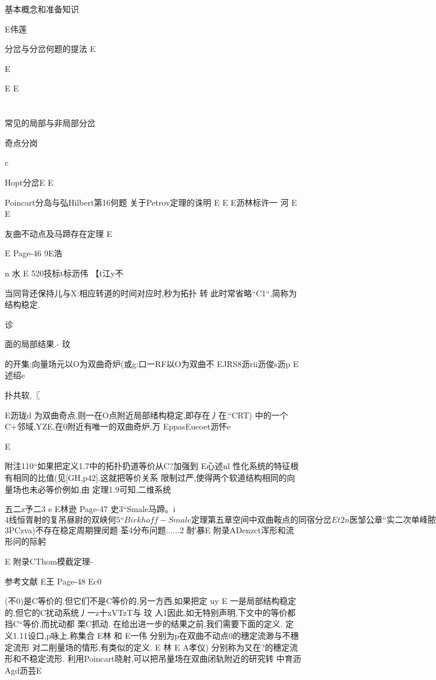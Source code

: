 基本概念和准备知识

E伟莲

分岔与分岔何题的提法
E

E

E
E
\part{}
常见的局部与非局部分岔

奇点分岗

c

Hopt分岔E
E

Poincart分岛与弘Hilbert第16何题
关于Petrov定理的诛明
E
E
E沥林标许一
河
E
E

友曲不动点及马蹄存在定理
E

E
Page-46
9E浩

n
水
E
520技标t标沥伟
【t江y不

当同背还保持儿与X:相应转道的时间对应时,秒为拓扑
转
此时常省略“C1“,简称为结构稳定.

诊

面的局部结果.-
玟

的开集;向量场元以O为双曲奇炉(或g:口一RF以O为双曲不
EJRS8沥rii沥俊s沥p
E述绍e

扑共软,〖

E沥珑d
为双曲奇点,则一在O点附近局部绪构稳定,即存在丿在.“CRT)
中的一个C+邻域,YZE,在0附近有唯一的双曲奇炉,万
EppasEueoet沥怀e

E

附注110“如果把定义1.7中的拓扑扔道等价从C?加强到
E心述nl
性化系统的特征根有相同的比值(见[GH,p42].这就把等价关系
限制过严,使得两个软道结构相同的向量场也未必等价例如,由
定理1.9可知,二维系统

五二z予二3
e
E林逊
Page-47
史3“Smale马蹄。i
$4线恒胥射的复吊昼尉的双峡何
5“Birkhoff-Smale定理
第五章空间中双曲鞍点的同宿分岔
Et
2n
医
邹公章“实二次单峰脓射旋的颂引子
E河玲
E沥沥腾3浩5
$3PCzva)不存在稳定周期狸闵题
荃4分布问题......2
耐′暴E
附录ADenzct浑形和流形问的际躬

E
附录CThom模截定理-

参考文献
E王
Page-48
Ec0

(不0)是C等价的.但它们不是C等价的,另一方西,如果把定
uy
E
一是局部结构稳定的,但它的C扰动系统丿一z十xVTzT与
玟
人1因此,如无特别声明,下文中的等价都挡C“等价,而扰动都
栗C抓动.
在给出进一步的结果之前,我们需要下面的定义.
定义1.11设口,p咏上.称集合
E林
和
E一伟
分别为p在双曲不动点0的穗定流渺与不穗定流形
对二削量场的情形,有类似的定义.
E
林
E
A孝仪)
分别称为又在?的穗定流形和不稳定流形.
利用Poincart晓射,可以把吊量场在双曲闭轨附近的研究转
中育沥
Agd沥芸E

